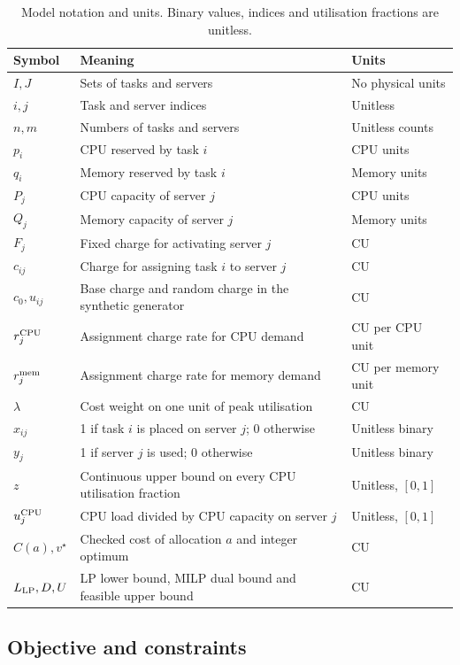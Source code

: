 \documentclass[10pt,a4paper]{article}
\begin{document}
\begin{table}[htbp]
\centering
\caption{Model notation and units. Binary values, indices and utilisation fractions are unitless.}
\label{tab:notation}
\small
\begin{tabularx}{\textwidth}{@{}lXl@{}}
\toprule
Symbol & Meaning & Units \\
\midrule
$I,J$ & Sets of tasks and servers & No physical units \\
$i,j$ & Task and server indices & Unitless \\
$n,m$ & Numbers of tasks and servers & Unitless counts \\
$p_i$ & CPU reserved by task $i$ & CPU units \\
$q_i$ & Memory reserved by task $i$ & Memory units \\
$P_j$ & CPU capacity of server $j$ & CPU units \\
$Q_j$ & Memory capacity of server $j$ & Memory units \\
$F_j$ & Fixed charge for activating server $j$ & CU \\
$c_{ij}$ & Charge for assigning task $i$ to server $j$ & CU \\
$c_0,u_{ij}$ & Base charge and random charge in the synthetic generator & CU \\
$r^{\rm CPU}_j$ & Assignment charge rate for CPU demand & CU per CPU unit \\
$r^{\rm mem}_j$ & Assignment charge rate for memory demand & CU per memory unit \\
$\lambda$ & Cost weight on one unit of peak utilisation & CU \\
$x_{ij}$ & 1 if task $i$ is placed on server $j$; 0 otherwise & Unitless binary \\
$y_j$ & 1 if server $j$ is used; 0 otherwise & Unitless binary \\
$z$ & Continuous upper bound on every CPU utilisation fraction & Unitless, $[0,1]$ \\
$u^{\rm CPU}_j$ & CPU load divided by CPU capacity on server $j$ & Unitless, $[0,1]$ \\
$C(a),v^\star$ & Checked cost of allocation $a$ and integer optimum & CU \\
$L_{\rm LP},D,U$ & LP lower bound, MILP dual bound and feasible upper bound & CU \\
\bottomrule
\end{tabularx}
\end{table}

\subsection{Objective and constraints}
\end{document}
